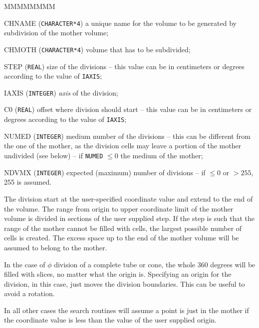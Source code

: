 \begin{DLtt}{MMMMMMMM}
\item[CHNAME] ({\tt CHARACTER*4}) a unique name for the volume to be generated
by subdivision of the mother volume;
\item[CHMOTH] ({\tt CHARACTER*4}) volume that has to be subdivided;
\item[STEP] ({\tt REAL}) size of the divisions -- this value can be in
centimeters or degrees according to the value of {\tt IAXIS};
\item[IAXIS] ({\tt INTEGER}) {\it axis} of the division;
\item[C0] ({\tt REAL}) offset where division should start -- this value can be
in centimeters or degrees according to the value of {\tt IAXIS};
\item[NUMED] ({\tt INTEGER}) medium number of the divisions -- this can be
different from the one of the mother, as the division cells may leave a
portion of the mother undivided (see below) --
if {\tt NUMED} $\leq 0$  the medium of the mother;
\item[NDVMX] ({\tt INTEGER}) expected (maximum) number of divisions -- if
$ \leq 0 $ or $ > 255 $, 255 is assumed.
\end{DLtt}

The division start at the user-specified coordinate value
and extend to the end of the volume. The range from origin to
upper coordinate limit of the mother volume is divided
in sections of the user supplied step. If the step is such that
the range of the mother cannot be filled with cells, the largest
possible number of cells is created.
The excess space up to the end
of the mother volume will be assumed to belong to the mother.

In the case of 
$\phi$ division of a complete tube or cone, the whole 360 degrees
will be filled with slices, no matter
what the origin is. Specifying an origin for the division, in this
case, just moves the
division boundaries. This can be useful to avoid a rotation.

In all other cases the search routines will
assume a point is just in the mother if the coordinate value is
less than the value of the user supplied origin.
